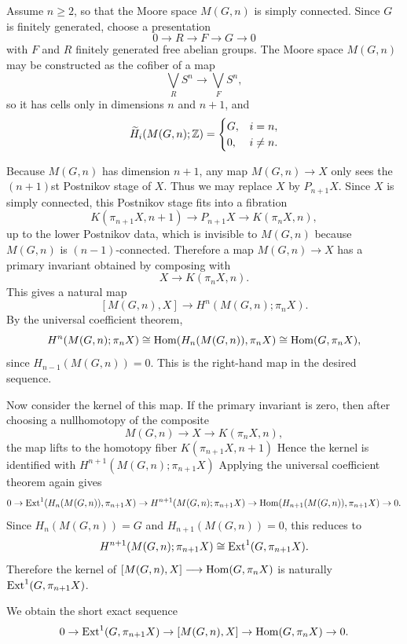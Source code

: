 \documentclass[12pt]{article}
\begin{document}
\begin{solution}
    Assume $n\geq 2$, so that the Moore space $M(G,n)$ is simply connected. Since $G$ is finitely generated, choose a presentation
    \[
        0\to R\to F\to G\to 0
    \]
    with $F$ and $R$ finitely generated free abelian groups. The Moore space $M(G,n)$ may be constructed as the cofiber of a map
    \[
        \bigvee_R S^n \longrightarrow \bigvee_F S^n,
    \]
    so it has cells only in dimensions $n$ and $n+1$, and
    \[
        \widetilde H_i(M(G,n);\mathbb{Z})=
        \begin{cases}
            G,& i=n,\\
            0,& i\neq n.
        \end{cases}
    \]

    Because $M(G,n)$ has dimension $n+1$, any map $M(G,n)\to X$ only sees the $(n+1)$st Postnikov stage of $X$. Thus we may replace $X$ by $P_{n+1}X$. Since $X$ is simply connected, this Postnikov stage fits into a fibration
    \[
        K(\pi_{n+1}X,n+1)\longrightarrow P_{n+1}X\longrightarrow K(\pi_nX,n),
    \]
    up to the lower Postnikov data, which is invisible to $M(G,n)$ because $M(G,n)$ is $(n-1)$-connected. Therefore a map $M(G,n)\to X$ has a primary invariant obtained by composing with
    \[
        X\to K(\pi_nX,n).
    \]
    This gives a natural map
    \[
        [M(G,n),X]\longrightarrow H^n(M(G,n);\pi_nX).
    \]
    By the universal coefficient theorem,
    \[
        H^n(M(G,n);\pi_nX)
        \cong \operatorname{Hom}(H_n(M(G,n)),\pi_nX)
        \cong \operatorname{Hom}(G,\pi_nX),
    \]
    since $H_{n-1}(M(G,n))=0$. This is the right-hand map in the desired sequence.

    Now consider the kernel of this map. If the primary invariant is zero, then after choosing a nullhomotopy of the composite
    \[
        M(G,n)\to X\to K(\pi_nX,n),
    \]
    the map lifts to the homotopy fiber $K(\pi_{n+1}X,n+1)$
    Hence the kernel is identified with $H^{n+1}(M(G,n);\pi_{n+1}X)$
    Applying the universal coefficient theorem again gives
    \[
        0\to \operatorname{Ext}^1(H_n(M(G,n)),\pi_{n+1}X)
        \to H^{n+1}(M(G,n);\pi_{n+1}X)
        \to \operatorname{Hom}(H_{n+1}(M(G,n)),\pi_{n+1}X)\to 0.
    \]
    Since $H_n(M(G,n))=G$ and $H_{n+1}(M(G,n))=0$, this reduces to
    \[
        H^{n+1}(M(G,n);\pi_{n+1}X)
        \cong \operatorname{Ext}^1(G,\pi_{n+1}X).
    \]
    Therefore the kernel of $[M(G,n),X]\longrightarrow \operatorname{Hom}(G,\pi_nX)$
    is naturally \(\operatorname{Ext}^1(G,\pi_{n+1}X)\).

    We obtain the short exact sequence
    \[
        0\to \operatorname{Ext}^1(G,\pi_{n+1}X)
        \to [M(G,n),X]
        \to \operatorname{Hom}(G,\pi_nX)
        \to 0.
    \]
\end{solution}
\end{document}
